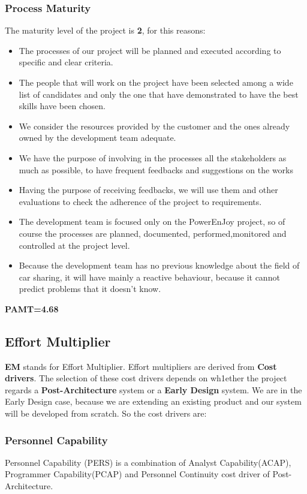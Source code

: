 \subsubsection{Process Maturity}
The maturity level of the project is \textbf{2}, for this reasons:

\begin{itemize}
	\item The processes of our project will be planned and executed according to specific and clear criteria. 
	\item The people that will work on the project have been selected among a wide list of candidates and only the one that have demonstrated to have the best skills have been chosen.
	\item We consider the resources provided by the customer and the ones already owned by the development team adequate.
	\item We have the purpose of involving in the processes all the stakeholders as much as possible, to have frequent feedbacks and suggestions on the works
	\item Having the purpose of receiving feedbacks, we will use them and other evaluations to check the adherence of the project to requirements.
	\item The development team is focused only on the PowerEnJoy project, so of course the processes are planned, documented, performed,monitored and controlled at the project level.
	\item Because the development team has no previous knowledge about the field of car sharing, it will have mainly a reactive behaviour, because it cannot predict problems that it doesn't know.  
\end{itemize}  
\textbf{PAMT=4.68}

\pagebreak
\subsection{Effort Multiplier}
\textbf{EM} stands for Effort Multiplier. Effort multipliers are derived from \textbf{Cost drivers}. The selection of these cost drivers depends on wh1ether the project regards a \textbf{Post-Architecture} system or a \textbf{Early Design} system. We are in the Early Design case, because we are extending an existing product and our system will be developed from scratch. So the cost drivers are:

\subsubsection{Personnel Capability}
Personnel Capability (PERS) is a combination of Analyst Capability(ACAP), Programmer Capability(PCAP) and Personnel Continuity cost driver of Post-Architecture.

